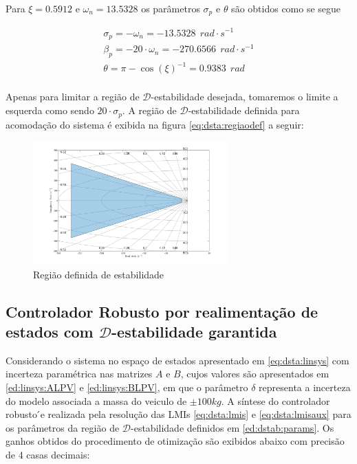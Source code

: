 Para $\xi=0.5912$ e $\omega_n=13.5328$ os parâmetros $\sigma_p$ e $\theta$ são obtidos como se segue

\begin{equation}\label{ed:dstab:params}
    \begin{split}
       \sigma_p=-\omega_n=-13.5328\ \ rad\cdot s^{-1}\\
       \beta_p=-20\cdot\omega_n=-270.6566\ \ rad\cdot s^{-1}\\
       \theta=\pi-\cos{(\xi)}^{-1}=0.9383\ \ rad\\    
    \end{split}
\end{equation}

Apenas para limitar a região de \( \mathcal{D}\)-estabilidade desejada, tomaremos o limite a esquerda como sendo $20\cdot\sigma_p$. A região de \( \mathcal{D}\)-estabilidade definida para acomodação do sistema é exibida na figura \eqref{eq:dsta:regiaodef} a seguir:

\FloatBarrier
\begin{figure}[htbp] 
  \begin{centering}
    \includegraphics[width=7.5cm]{img/regiao_d_estabilidade.png}
    \caption{Região definida de estabilidade}
    \label{eq:dsta:regiaodef}
  \end{centering}
\end{figure}
\FloatBarrier

\subsection{Controlador Robusto por realimentação de estados com \( \mathcal{D}\)-estabilidade garantida}
Considerando o sistema no espaço de estados apresentado em \eqref{eq:dsta:linsys} com incerteza paramétrica nas matrizes $A$ e $B$, cujos valores são apresentados em \eqref{ed:linsys:ALPV} e \eqref{ed:linsys:BLPV}, em que o parâmetro $\delta$ representa a incerteza do modelo associada a massa do veiculo de $\pm100kg$. A síntese do  controlador  robusto ́e  realizada  pela  resolução das LMIs \eqref{eq:dsta:lmis} e \eqref{eq:dsta:lmisaux} para os parâmetros da região de \( \mathcal{D}\)-estabilidade definidos em \eqref{ed:dstab:params}. Os ganhos obtidos do procedimento de otimização são exibidos abaixo com precisão de 4 casas decimais:

